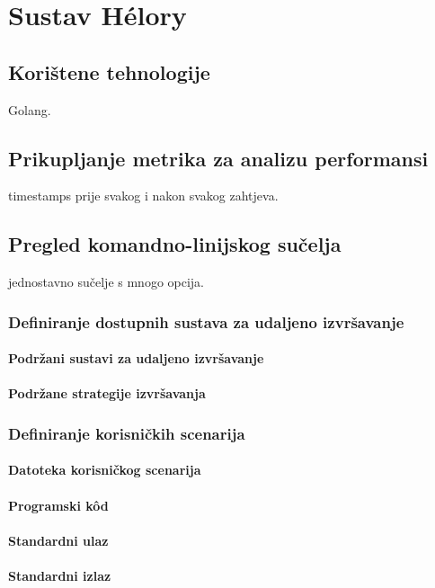 \documentclass[times, utf8, diplomski]{fer}
\begin{document}
\chapter{Sustav Hélory}
\section{Korištene tehnologije}
Golang.

\section{Prikupljanje metrika za analizu performansi}
timestamps prije svakog i nakon svakog zahtjeva.

\section{Pregled komandno-linijskog sučelja}
jednostavno sučelje s mnogo opcija.

\subsection{Definiranje dostupnih sustava za udaljeno izvršavanje}
\subsubsection{Podržani sustavi za udaljeno izvršavanje}
\subsubsection{Podržane strategije izvršavanja}
\subsection{Definiranje korisničkih scenarija}
\subsubsection{Datoteka korisničkog scenarija}
\subsubsection{Programski kôd}
\subsubsection{Standardni ulaz}
\subsubsection{Standardni izlaz}
\end{document}
